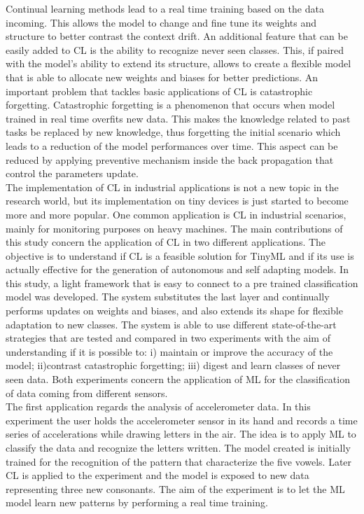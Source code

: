 \documentclass[12pt]{report}
\begin{document}
Continual learning methods lead to a real time training based on the data incoming. This allows the model to change and fine tune its weights and structure to better contrast the context drift.
An additional feature that can be easily added to CL is the ability to recognize never seen classes. This, if paired with the model's ability to extend its structure, allows to create a flexible model that is able to allocate new weights and biases for better predictions.
An important problem that tackles basic applications of CL is catastrophic forgetting. Catastrophic forgetting is a phenomenon that occurs when model trained in real time overfits new data. This makes the knowledge related to past tasks be replaced by new knowledge, thus forgetting the initial scenario which leads to a reduction of the model performances over time. This aspect can be reduced by applying preventive mechanism inside the back propagation that control the parameters update. \\
The implementation of CL in industrial applications is not a new topic in the research world, but its implementation on tiny devices is just started to become more and more popular. One common application is CL in industrial scenarios, mainly for monitoring purposes on heavy machines.
The main contributions of this study concern the application of CL in two different applications. The objective is to understand if CL is a feasible solution for TinyML and if its use is actually effective for the generation of autonomous and self adapting models. In this study, a light framework that is easy to connect to a pre trained classification model was developed. The system substitutes the last layer and continually performs updates on weights and biases, and also extends its shape for flexible adaptation to new classes. The system is able to use different state-of-the-art strategies that are tested and compared in two experiments with the aim of understanding if it is possible to: i) maintain or improve the accuracy of the model; ii)contrast catastrophic forgetting; iii) digest and learn classes of never seen data. Both experiments concern the application of ML for the classification of data coming from different sensors. \\
The first application regards the analysis of accelerometer data. In this experiment the user holds the accelerometer sensor in its hand and records a time series of accelerations while drawing letters in the air. The idea is to apply ML to classify the data and recognize the letters written. The model created is initially trained for the recognition of the pattern that characterize the five vowels. Later CL is applied to the experiment and the model is exposed to new data representing three new consonants. The aim of the experiment is to let the ML model learn new patterns by performing a real time training.
\end{document}

